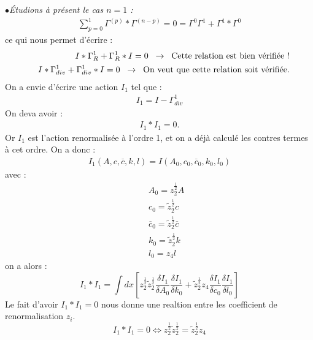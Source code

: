 \documentclass[a4paper,11pt]{article} %
\theoremstyle{plain}
\theoremstyle{definition}
\theoremstyle{remark}
\numberwithin{equation}{section}
\numberwithin{equation}{subsection}
\numberwithin{figure}{section}
\begin{document}
\noindent
$\bullet$\textit{Étudions à présent le cas $n=1$ :}
\begin{eqnarray*}
 \sum_{p=0}^{1} \Gamma^{(p)} * \Gamma^{(n-p)} = 0 = \Gamma^{0} \Gamma^{1} + \Gamma^{1} * \Gamma^{0}
\end{eqnarray*}
ce qui nous permet d'écrire :
\begin{eqnarray*}
 && I * \Gamma^{1}_{R} + \Gamma^{1}_{R} * I = 0 \hspace{2mm} \rightarrow \hspace{2mm} \text{Cette relation est bien vérifiée !} \\
 && I * \Gamma^{1}_{div} + \Gamma^{1}_{div} * I = 0 \hspace{2mm} \rightarrow \hspace{2mm} \text{On veut que cette relation soit 
vérifiée.}
\end{eqnarray*}
On a envie d'écrire une action $I_{1}$ tel que :
\begin{eqnarray*}
I_{1} = I - \Gamma^{1}_ {div}
\end{eqnarray*}
On deva avoir :
\begin{eqnarray*}
 I_{1} * I_{1} = 0.
\end{eqnarray*}
Or $I_{1}$ est l'action renormalisée à l'ordre 1, et on a déjà calculé les contres termes à cet ordre. On a donc :
\begin{eqnarray*}
 I_{1} \left( A, c, \overline{c}, k, l \right) = I \left( A_{0}, c_{0}, \overline{c}_{0}, k_{0}, l_{0} \right)
\end{eqnarray*}
avec :
\begin{eqnarray*}
 && A_{0} = z_{2}^{\frac{1}{2}} A  \\
 && c_{0} = \tilde{z}_{2}^{\frac{1}{2}} c  \\
 && \overline{c}_{0} = \tilde{z}_{2}^{\frac{1}{2}} \overline{c} \\
 && k_{0} = \tilde{z}_{2}^{\frac{1}{2}} k \\
 && l_{0} = z_{4} l
\end{eqnarray*}
on a alors :
\begin{equation*}
 I_{1} * I_{1} = \int dx \left[ z_{2}^{\frac{1}{2}} \tilde{z}_{2}^{\frac{1}{2}} \frac{\delta I_{1}}{\delta A_{0}} \frac{\delta I_{1}}{\delta k_{0}}
+ \tilde{z}_{2}^{\frac{1}{2}} z_{4} \frac{\delta I_{1}}{\delta c_{0}}\frac{\delta I_{1}}{\delta l_{0}} \right]
\end{equation*}
Le fait d'avoir $I_{1} * I_{1} = 0$ nous donne une realtion entre les coefficient de renormalisation $z_{i}$.
\begin{equation*}
 I_{1} * I_{1} = 0 \Leftrightarrow z_{2}^{\frac{1}{2}} \tilde{z}_{2}^{\frac{1}{2}} = \tilde{z}_{2}^{\frac{1}{2}} z_{4}
\end{equation*}
\end{document}
